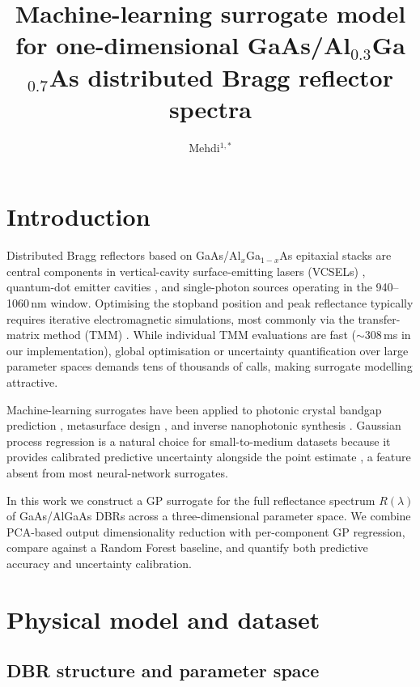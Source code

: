 \documentclass[9pt,twocolumn]{optica-article}
\title{Machine-learning surrogate model for one-dimensional GaAs/Al$_{0.3}$Ga$_{0.7}$As
       distributed Bragg reflector spectra}
\author{Mehdi$^{1,*}$}
\begin{document}
\maketitle

\section{Introduction}

Distributed Bragg reflectors based on GaAs/Al$_x$Ga$_{1-x}$As epitaxial stacks
are central components in vertical-cavity surface-emitting lasers (VCSELs)
\cite{Saleh2019}, quantum-dot emitter cavities \cite{Lodahl2015}, and
single-photon sources operating in the 940--1060\,nm window.
Optimising the stopband position and peak reflectance typically requires iterative
electromagnetic simulations, most commonly via the transfer-matrix method (TMM)
\cite{Born1999}.
While individual TMM evaluations are fast (${\sim}308$\,ms in our implementation),
global optimisation or uncertainty quantification over large parameter spaces
demands tens of thousands of calls, making surrogate modelling attractive.

Machine-learning surrogates have been applied to photonic crystal bandgap prediction
\cite{Pilozzi2018}, metasurface design \cite{Liu2018}, and inverse nanophotonic
synthesis \cite{Malkiel2018}.
Gaussian process regression is a natural choice for small-to-medium datasets because
it provides calibrated predictive uncertainty alongside the point estimate
\cite{Rasmussen2006}, a feature absent from most neural-network surrogates.

In this work we construct a GP surrogate for the full reflectance spectrum
$R(\lambda)$ of GaAs/AlGaAs DBRs across a three-dimensional parameter space.
We combine PCA-based output dimensionality reduction with per-component GP
regression, compare against a Random Forest baseline, and quantify both predictive
accuracy and uncertainty calibration.


\section{Physical model and dataset}

\subsection{DBR structure and parameter space}
\end{document}
